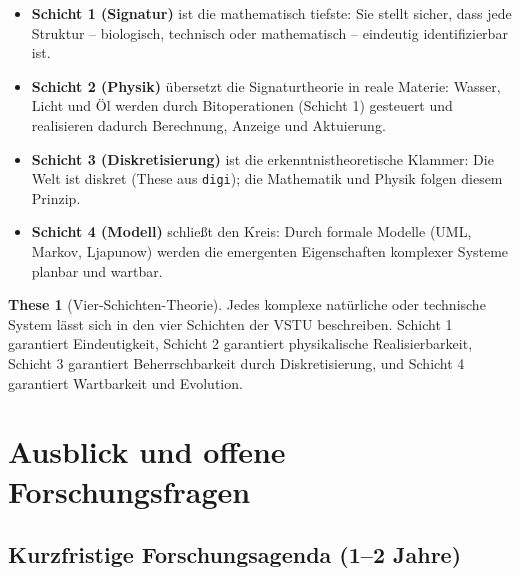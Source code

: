 ﻿\documentclass[a4paper,12pt]{scrreprt}
\theoremstyle{definition}
\newtheorem{these}{These}[section]
\begin{document}
\begin{itemize}
  \item \textbf{Schicht 1 (Signatur)} ist die mathematisch tiefste:
    Sie stellt sicher, dass jede Struktur -- biologisch, technisch oder
    mathematisch -- eindeutig identifizierbar ist.
  \item \textbf{Schicht 2 (Physik)} übersetzt die Signaturtheorie in
    reale Materie: Wasser, Licht und Öl werden durch Bitoperationen
    (Schicht 1) gesteuert und realisieren dadurch Berechnung, Anzeige
    und Aktuierung.
  \item \textbf{Schicht 3 (Diskretisierung)} ist die erkenntnistheoretische
    Klammer: Die Welt ist diskret (These aus \texttt{digi}); die Mathematik
    und Physik folgen diesem Prinzip.
  \item \textbf{Schicht 4 (Modell)} schließt den Kreis: Durch formale
    Modelle (UML, Markov, Ljapunow) werden die emergenten Eigenschaften
    komplexer Systeme planbar und wartbar.
\end{itemize}

\begin{these}[Vier-Schichten-Theorie]
  Jedes komplexe natürliche oder technische System lässt sich in den
  vier Schichten der VSTU beschreiben. Schicht 1 garantiert Eindeutigkeit,
  Schicht 2 garantiert physikalische Realisierbarkeit, Schicht 3 garantiert
  Beherrschbarkeit durch Diskretisierung, und Schicht 4 garantiert
  Wartbarkeit und Evolution.
\end{these}

\section{Ausblick und offene Forschungsfragen}
\label{sec:ausblick}

\subsection{Kurzfristige Forschungsagenda (1--2 Jahre)}
\end{document}
